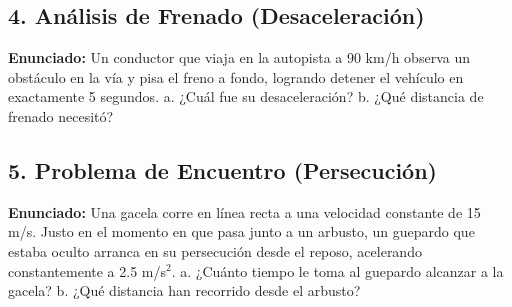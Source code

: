 \documentclass[12pt, letterpaper]{article}
\begin{document}
\subsection*{4. Análisis de Frenado (Desaceleración)}
\noindent \textbf{Enunciado:} Un conductor que viaja en la autopista a 90 km/h observa un obstáculo en la vía y pisa el freno a fondo, logrando detener el vehículo en exactamente 5 segundos. a. ¿Cuál fue su desaceleración? b. ¿Qué distancia de frenado necesitó?


\subsection*{5. Problema de Encuentro (Persecución)}
\noindent \textbf{Enunciado:} Una gacela corre en línea recta a una velocidad constante de 15 m/s. Justo en el momento en que pasa junto a un arbusto, un guepardo que estaba oculto arranca en su persecución desde el reposo, acelerando constantemente a 2.5 m/s$^2$. a. ¿Cuánto tiempo le toma al guepardo alcanzar a la gacela? b. ¿Qué distancia han recorrido desde el arbusto?

\end{document}
